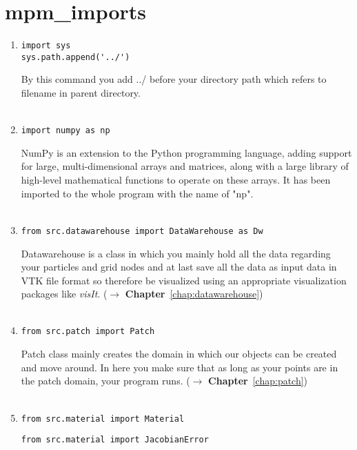 \documentclass[11pt,fleqn]{book} %
\begin{document}
\chapter{mpm\_imports}
\begin{enumerate}
\item 
\begin{lstlisting}
import sys
sys.path.append('../')
\end{lstlisting}
By this command you add ../ before your directory path which refers to filename in parent directory.\\ \\
\item 
\begin{lstlisting}
import numpy as np
\end{lstlisting}
NumPy is an extension to the Python programming language, adding support for large, multi-dimensional arrays and matrices, along with a large library of high-level mathematical functions to operate on these arrays. It has been imported to the whole program with the name of "np".\\ \\
\item 
\begin{lstlisting}
from src.datawarehouse import DataWarehouse as Dw
\end{lstlisting}
Datawarehouse is a class in which you mainly hold all the data regarding your particles and grid nodes and at last save all the data as input data in VTK file format so therefore be visualized using an appropriate visualization packages like \emph{visIt}. ($\rightarrow$ \textbf{Chapter}~\ref{chap:datawarehouse})\\ \\
\item 
\begin{lstlisting}
from src.patch import Patch
\end{lstlisting}
Patch class mainly creates the domain in which our objects can be created and move around. In here you make sure that as long as your points are in the patch domain, your program runs. ($\rightarrow$ \textbf{Chapter}~\ref{chap:patch})\\ \\
\item 
\begin{lstlisting}
from src.material import Material
\end{lstlisting}
\begin{lstlisting}
from src.material import JacobianError
\end{lstlisting}


\end{enumerate}
\end{document}
